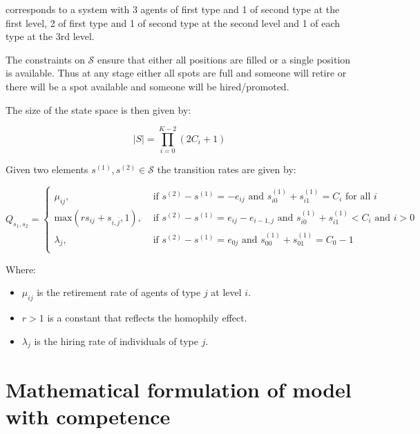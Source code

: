 \documentclass{article}
\renewcommand{\S}{\mathcal{S}}
\begin{document}
corresponds to a system with 3 agents of first type and 1 of second type at the
first level, 2 of first type and 1 of second type at the second level and 1 of
each type at the 3rd level.

The constraints on \(\S\) ensure that either all positions are filled or a
single position is available. Thus at any stage either all spots are full and
someone will retire or there will be a spot available and someone will be
hired/promoted.

The size of the state space is then given by:

\begin{equation}
    |S| = \prod_{i=0}^{K - 2}\left(2C_i + 1\right)
\end{equation}

Given two elements \(s^{(1)}, s^{(2)}\in \S\) the transition rates are given by:

\begin{equation}\label{eqn:transition_rates}
    Q_{s_1, s_2} =
        \begin{cases}
            \mu_{ij},& \text{ if }s^{(2)} - s^{(1)} = -e_{ij}
            \text{ and }s^{(1)}_{i0} + s^{(1)}_{i1} = C_i\text{ for all }i\\
           \text{max}(rs_{ij} + s_{i, \bar j}, 1),& \text{ if }s^{(2)} - s^{(1)} = e_{ij} - e_{i-1, j}
                                     \text{ and }s^{(1)}_{i0} + s^{(1)}_{i1} < C_{i}
                                     \text{ and }i > 0\\
           \lambda_{j},&\text{ if }s^{(2)} - s^{(1)} = e_{0j}
                        \text{ and }s^{(1)}_{00} + s^{(1)}_{01} = C_{0} - 1\\
        \end{cases}
\end{equation}

Where:

\begin{itemize}
    \item \(\mu_{ij}\) is the retirement rate of agents of type \(j\) at level
        \(i\).
    \item \(r > 1\) is a constant that reflects the homophily effect.
    \item \(\lambda_j\) is the hiring rate of individuals of type \(j\).
\end{itemize}


\section{Mathematical formulation of model with competence}
\end{document}
